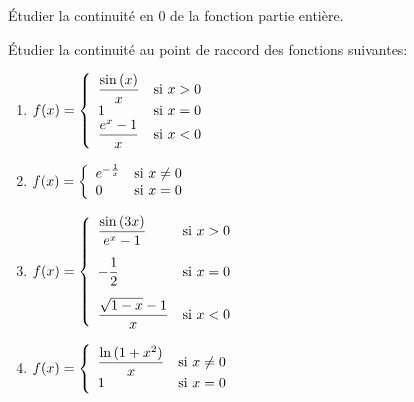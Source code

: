 \documentclass[a4paper, 11pt]{article}
\begin{document}
\begin{exemple}
	\'Etudier la continuit\'e en $0$ de la fonction partie enti\`{e}re.
\end{exemple}

{\footnotesize \begin{exercice}
	\'Etudier la continuit\'e au point de raccord des fonctions suivantes:
	\begin{enumerate}

		\item $f(x)=\left\lbrace\begin{array}{ll} \ddp\frac{\sin{(x)}}{x} &\hbox{si}\ x>0\\ 1 & \hbox{si}\ x=0\\ \ddp\frac{e^x-1}{x} &\hbox{si}\ x<0  \end{array}\right.$\vsec
		\item $f(x)=\left\lbrace\begin{array}{ll} e^{-\frac{1}{x}} &\hbox{si}\ x\not=0\\ 0 & \hbox{si}\ x=0   \end{array}\right.$


		\item $f(x)=\left\lbrace\begin{array}{ll} \ddp\frac{\sin{(3x)}}{e^x-1} &\hbox{si}\ x>0 \vsec\\ -\ddp\demi & \hbox{si}\ x=0\vsec\\ \ddp\frac{\sqrt{1-x}-1}{x} &\hbox{si}\ x<0  \end{array}\right.$\vsec
		\item $f(x)=\left\lbrace\begin{array}{ll} \ddp\frac{\ln{(1+x^2)}}{x} &\hbox{si}\ x\not=0\\ 1 & \hbox{si}\ x=0 \end{array}\right.$

	\end{enumerate}
\end{exercice}}




\end{document}
